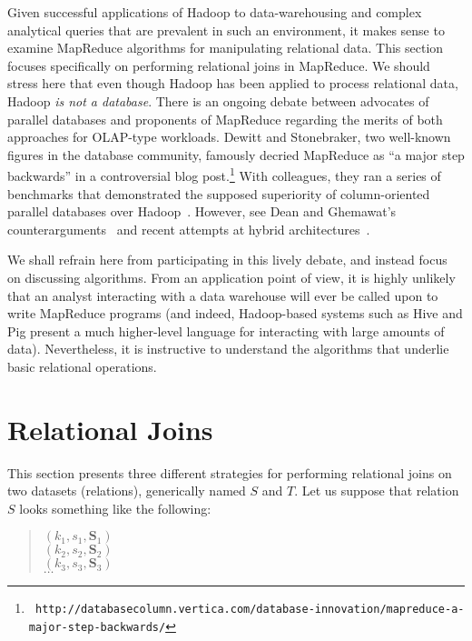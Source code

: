 Given successful applications of Hadoop to data-warehousing and
complex analytical queries that are prevalent in such an environment,
it makes sense to examine MapReduce algorithms for manipulating
relational data.  This section focuses specifically on performing
relational joins in MapReduce.  We should stress here that even though
Hadoop has been applied to process relational data, Hadoop \emph{is not
  a database}.  There is an ongoing debate between advocates of
parallel databases and proponents of MapReduce regarding the merits of
both approaches for OLAP-type workloads.  Dewitt and Stonebraker, two
well-known figures in the database community, famously decried
MapReduce as ``a major step backwards'' in a controversial blog
post.\footnote{\texttt{
  http://databasecolumn.vertica.com/database-innovation/mapreduce-a-major-step-backwards/}}
With colleagues, they ran a series of benchmarks that demonstrated the
supposed superiority of column-oriented parallel databases over
Hadoop~\cite{Pavlo_etal_SIGMOD2009,Stonebraker_etal_CACM2010}. However,
see Dean and Ghemawat's counterarguments~\cite{Dean_Ghemawat_CACM2010}
and recent attempts at hybrid
architectures~\cite{Abouzeid_etal_VLDB2009}.

We shall refrain here from participating in this lively debate, and
instead focus on discussing algorithms.  From an application point of
view, it is highly unlikely that an analyst interacting with a data
warehouse will ever be called upon to write MapReduce programs (and
indeed, Hadoop-based systems such as Hive and Pig present a much
higher-level language for interacting with large amounts of data).
Nevertheless, it is instructive to understand the algorithms that
underlie basic relational operations.

\section{Relational Joins}
\label{chapter3:joins}

This section presents three different strategies for performing
relational joins on two datasets (relations), generically named $S$
and $T$.  Let us suppose that relation $S$ looks something like the
following:

\begin{quote}
$(k_1, s_1, \textbf{S}_1)$ \\
$(k_2, s_2, \textbf{S}_2)$ \\
$(k_3, s_3, \textbf{S}_3)$ \\
$\ldots$
\end{quote}

